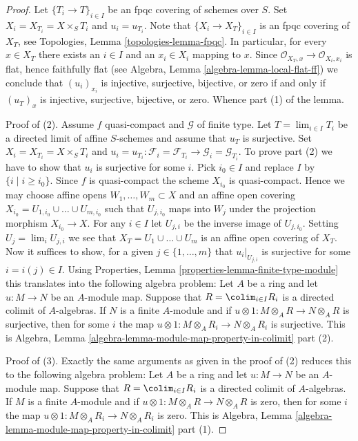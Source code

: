 \begin{proof}
Let $\{T_i \to T\}_{i \in I}$ be an fpqc covering of schemes over $S$.
Set $X_i = X_{T_i} = X \times_S T_i$ and $u_i = u_{T_i}$.
Note that $\{X_i \to X_T\}_{i \in I}$ is an fpqc covering of $X_T$, see
Topologies, Lemma \ref{topologies-lemma-fpqc}.
In particular, for every $x \in X_T$ there exists an $i \in I$
and an $x_i \in X_i$ mapping to $x$. Since
$\mathcal{O}_{X_T, x} \to \mathcal{O}_{X_i, x_i}$ is flat, hence
faithfully flat (see
Algebra, Lemma \ref{algebra-lemma-local-flat-ff})
we conclude that $(u_i)_{x_i}$ is injective, surjective, bijective, or zero
if and only if $(u_T)_x$ is injective, surjective, bijective, or zero.
Whence part (1) of the lemma.

\medskip\noindent
Proof of (2). Assume $f$ quasi-compact and $\mathcal{G}$ of finite type.
Let $T = \lim_{i \in I} T_i$ be a directed limit of affine $S$-schemes
and assume that $u_T$ is surjective.
Set $X_i = X_{T_i} = X \times_S T_i$ and
$u_i = u_{T_i} : \mathcal{F}_i = \mathcal{F}_{T_i}
\to \mathcal{G}_i = \mathcal{G}_{T_i}$.
To prove part (2) we have to show that $u_i$ is surjective for some $i$.
Pick $i_0 \in I$ and replace $I$ by $\{i \mid i \geq i_0\}$.
Since $f$ is quasi-compact the scheme $X_{i_0}$ is quasi-compact.
Hence we may choose affine opens $W_1, \ldots, W_m \subset X$
and an affine open covering
$X_{i_0} = U_{1, i_0} \cup \ldots \cup U_{m, i_0}$ such that
$U_{j, i_0}$ maps into $W_j$ under the projection morphism $X_{i_0} \to X$.
For any $i \in I$ let $U_{j, i}$ be the inverse image of $U_{j, i_0}$.
Setting $U_j = \lim_i U_{j, i}$ we see that $X_T = U_1 \cup \ldots \cup U_m$
is an affine open covering of $X_T$. Now it suffices to show, for a given
$j \in \{1, \ldots, m\}$ that $u_i|_{U_{j, i}}$ is surjective for some
$i = i(j) \in I$. Using
Properties, Lemma \ref{properties-lemma-finite-type-module}
this translates into the following algebra problem:
Let $A$ be a ring and let $u : M \to N$ be an $A$-module map.
Suppose that $R = \colim_{i \in I} R_i$ is a directed colimit
of $A$-algebras. If $N$ is a finite $A$-module and if
$u \otimes 1 : M \otimes_A R \to N \otimes_A R$ is surjective, then
for some $i$ the map
$u \otimes 1 : M \otimes_A R_i \to N \otimes_A R_i$ is surjective.
This is
Algebra, Lemma \ref{algebra-lemma-module-map-property-in-colimit} part (2).

\medskip\noindent
Proof of (3). Exactly the same arguments as given in the proof of (2)
reduces this to the following algebra problem:
Let $A$ be a ring and let $u : M \to N$ be an $A$-module map.
Suppose that $R = \colim_{i \in I} R_i$ is a directed colimit
of $A$-algebras. If $M$ is a finite $A$-module and if
$u \otimes 1 : M \otimes_A R \to N \otimes_A R$ is zero, then
for some $i$ the map
$u \otimes 1 : M \otimes_A R_i \to N \otimes_A R_i$ is zero.
This is
Algebra, Lemma \ref{algebra-lemma-module-map-property-in-colimit} part (1).


\end{proof}
